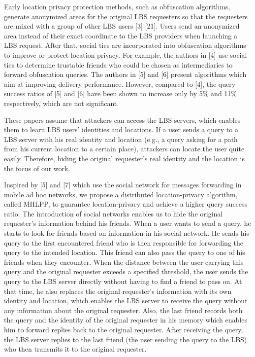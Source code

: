 \documentclass[conference]{IEEEtran}
\begin{document}
Early location privacy protection methods, such as obfuscation algorithms, generate anonymized areas for the original LBS requesters so that the requesters are mixed with a group of other LBS users [3] [21]. Users send an anonymized area instead of their exact coordinate to the LBS providers when launching a LBS request. After that, social ties are incorporated into obfuscation algorithms to improve or protect location privacy. For example, the authors in [4] use social ties to determine trustable friends who could be chosen as intermediaries to forward obfuscation queries. The authors in [5] and [6] present algorithms which aim at improving delivery performance. However, compared to [4], the query success ratios of [5] and [6] have been shown to increase only by 5\% and 11\% respectively, which are not significant.

These papers assume that attackers can access the LBS servers, which enables them to learn LBS users’ identities and locations. If a user sends a query to a LBS server with his real identity and location (e.g., a query asking for a path from his current location to a certain place), attackers can locate the user quite easily. Therefore, hiding the original requester’s real identity and the location is the focus of our work.

Inspired by [5] and [7] which use the social network for messages forwarding in mobile ad hoc networks, we propose a distributed location-privacy algorithm, called MHLPP, to guarantee location-privacy and achieve a higher query success ratio. The introduction of social networks enables us to hide the original requester’s information behind his friends. When a user wants to send a query, he starts to look for friends based on information in his social network. He sends his query to the first encountered friend who is then responsible for forwarding the query to the intended location. This friend can also pass the query to one of his friends when they encounter. When the distance between the user carrying this query and the original requester exceeds a specified threshold, the user sends the query to the LBS server directly without having to find a friend to pass on. At that time, he also replaces the original requester’s information with its own identity and location, which enables the LBS server to receive the query without any information about the original requester. Also, the last friend records both the query and the identity of the original requester in his memory which enables him to forward replies back to the original requester. After receiving the query, the LBS server replies to the last friend (the user sending the query to the LBS) who then transmits it to the original requester. 
\end{document}
